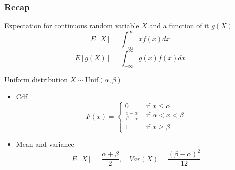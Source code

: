 \documentclass[slidestop,compress,mathserif]{beamer}
\begin{document}
\begin{frame}\frametitle{Recap}

Expectation for continuous random variable $X$ and a function of it $g(X)$
\[E[X] = \int_{-\infty}^{\infty} x f(x) dx\]
\[E[g(X)] = \int_{-\infty}^{\infty} g(x) f(x) dx\]


Uniform distribution $X \sim \text{Unif}(\alpha, \beta)$
{
\begin{itemize}
\item Cdf \vspace{-0.6cm}
\[ F(x) =
\begin{cases}
0 & \text{ if } x \leq \alpha\\
\frac{x-\alpha}{\beta-\alpha} & \text{ if } \alpha < x < \beta\\
1 & \text{ if } x \geq \beta
\end{cases}
 \]
\end{itemize}
}
\begin{itemize}
\item Mean and variance  \vspace{-0.2cm}
\[ E[X]   = \frac{\alpha + \beta}{2}, \quad Var(X)   = \frac{(\beta - \alpha)^2}{12} \]
\end{itemize}



\end{frame}
\end{document}
